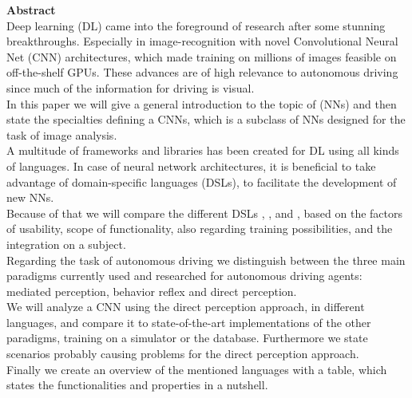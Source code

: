 {\bf\Large Abstract} \\ [1em]
Deep learning (DL) came into the foreground of research after some stunning breakthroughs. Especially in image-recognition with novel Convolutional Neural Net (CNN) architectures, which made training on millions of images feasible on off-the-shelf GPUs. These advances are of high relevance to autonomous driving since much of the information for driving is visual.\\
In this paper we will give a general introduction to the topic of \nns (NNs) and then state the specialties defining a CNNs, which is a subclass of NNs designed for the task of image analysis.\\
A multitude of frameworks and libraries has been created for DL using all kinds of languages. In case of neural network architectures, it is beneficial to take advantage of domain-specific languages (DSLs), to facilitate the development of new NNs.\\
Because of that we will compare the different DSLs \cnnarch, \caffe, \caffetwo and \mxnet, based on the factors of usability, scope of functionality, also regarding training possibilities, and the integration on a subject.\\
Regarding the task of autonomous driving we distinguish between the three main paradigms currently used and researched for autonomous driving agents: mediated perception, behavior reflex and direct perception.\\
We will analyze a CNN using the direct perception approach, in different languages, and compare it to state-of-the-art implementations of the other paradigms, training on a simulator \torcs or the \kitti database. Furthermore we state scenarios probably causing problems for the direct perception approach. \\
Finally we create an overview of the mentioned languages with a table, which states the functionalities and properties in a nutshell.
\cleardoublepage
